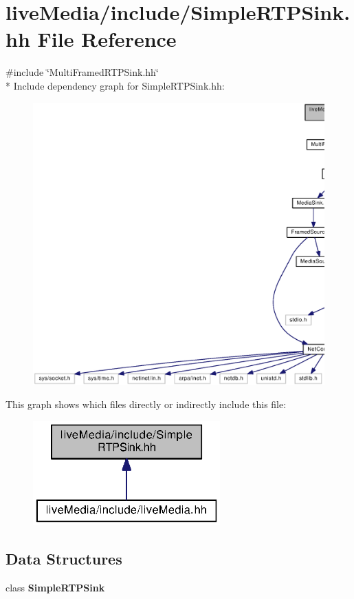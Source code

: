 \section{live\+Media/include/\+Simple\+R\+T\+P\+Sink.hh File Reference}
\label{SimpleRTPSink_8hh}
{\ttfamily \#include \char`\"{}Multi\+Framed\+R\+T\+P\+Sink.\+hh\char`\"{}}\\*
Include dependency graph for Simple\+R\+T\+P\+Sink.\+hh\+:
\nopagebreak
\begin{figure}[H]
\begin{center}
\leavevmode
\includegraphics[width=350pt]{SimpleRTPSink_8hh__incl}
\end{center}
\end{figure}
This graph shows which files directly or indirectly include this file\+:
\nopagebreak
\begin{figure}[H]
\begin{center}
\leavevmode
\includegraphics[width=204pt]{SimpleRTPSink_8hh__dep__incl}
\end{center}
\end{figure}
\subsection*{Data Structures}
\begin{DoxyCompactItemize}
\item 
class {\bf Simple\+R\+T\+P\+Sink}
\end{DoxyCompactItemize}
